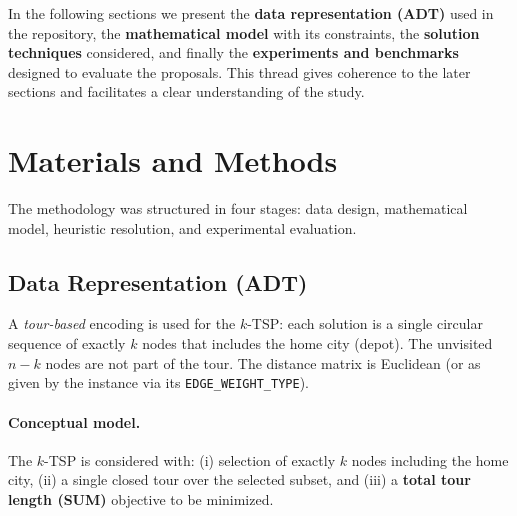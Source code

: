 \documentclass[conference]{IEEEtran}
\begin{document}
In the following sections we present the \textbf{data representation (ADT)} used in the repository, the \textbf{mathematical model} with its constraints, the \textbf{solution techniques} considered, and finally the \textbf{experiments and benchmarks} designed to evaluate the proposals. This thread gives coherence to the later sections and facilitates a clear understanding of the study.

\section{Materials and Methods}
The methodology was structured in four stages: data design, mathematical model, heuristic resolution, and experimental evaluation.

\subsection{Data Representation (ADT)}

A \emph{tour-based} encoding is used for the $k$-TSP: each solution is a single circular sequence of exactly $k$ nodes that includes the home city (depot). The unvisited $n-k$ nodes are not part of the tour. The distance matrix is Euclidean (or as given by the instance via its \texttt{EDGE\_WEIGHT\_TYPE}).

\paragraph{Conceptual model.}
The $k$-TSP is considered with:
(i) selection of exactly $k$ nodes including the home city,
(ii) a single closed tour over the selected subset, and
(iii) a \textbf{total tour length (SUM)} objective to be minimized.
\end{document}
